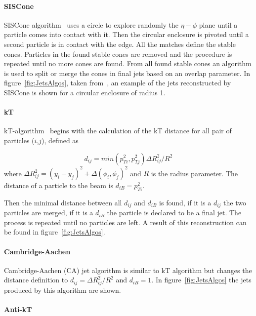 \paragraph{SISCone}

SISCone algorithm~\cite{Salam:2007xv} uses a circle to explore randomly the $\eta-\phi$ plane until a particle comes into contact with it. Then the circular enclosure is pivoted until a second particle is in contact with the edge. All the matches define the stable cones. Particles in the found stable cones are removed and the procedure is repeated until no more cones are found. From all found stable cones an algorithm is used to split or merge the cones in final jets based on an overlap parameter. In figure~\ref{fig:JetsAlgos}, taken from~\cite{Cacciari:2008gp}, an example of the jets reconstructed by SISCone is shown for a circular enclosure of radius 1. 

\paragraph{kT}

kT-algorithm~\cite{Ellis:1993tq} begins with the calculation of the kT distance for all pair of particles ($i$,$j$), defined as

\begin{equation}
  \label{eq:kt}
  d_{ij}=min(p_{Ti}^{2},p_{Tj}^{2})\Delta R_{ij}^{2}/R^{2}
\end{equation} where $\Delta R_{ij}^{2}=(y_{i}-y_{j})^{2}+\Delta(\phi_{i},\phi_{j})^{2}$ and $R$ is the radius parameter. The distance of a particle to the beam is $d_{iB}=p_{Ti}^{2}$. 

Then the minimal distance between all $d_{ij}$ and $d_{iB}$ is found, if it is a $d_{ij}$ the two particles are merged, if it is a $d_{iB}$ the particle is declared to be a final jet. The process is repeated until no particles are left. A result of this reconstruction can be found in figure~\ref{fig:JetsAlgos}. 

\paragraph{Cambridge-Aachen}

Cambridge-Aachen (CA) jet algorithm is similar to kT algorithm but changes the distance definition to $d_{ij}=\Delta R_{ij}^{2}/R^{2}$ and $d_{iB}=1$. In figure~\ref{fig:JetsAlgos} the jets produced by this algorithm are shown.

\paragraph{Anti-kT}

